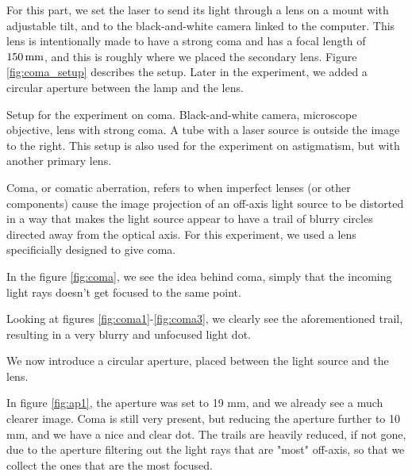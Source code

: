 
For this part, we set the laser to send its light through
a lens on a mount with adjustable tilt, and to the black-and-white camera
linked to the computer. This lens is intentionally made to have a strong coma
and has a focal length of $150 \, \textrm{mm}$, and this is roughly where we placed the
secondary lens. Figure \vref{fig:coma_setup} describes the setup. Later in the
experiment, we added a circular aperture between the lamp and the lens.

    {Setup for the experiment on coma. Black-and-white camera, microscope
    objective, lens with strong coma. A tube with a laser source is outside the
    image to the right. This setup is also used for the experiment on
    astigmatism, but with another primary lens.}

Coma, or comatic aberration, refers to when imperfect lenses 
(or other components) cause the image projection of an off-axis 
light source to be distorted in a way that makes the light source
appear to have a trail of blurry circles directed away from the 
optical axis. For this experiment, we used a lens specificially 
designed to give coma. 

In the figure \vref{fig:coma}, we see the idea behind coma, 
simply that the incoming light rays doesn't get focused to the same point.



Looking at figures \vref{fig:coma1}-\vref{fig:coma3}, we clearly see
the aforementioned trail, resulting in a very blurry and unfocused light dot.

We now introduce a circular aperture, placed between the light source and the
lens.

In figure \vref{fig:ap1}, the aperture was set to 19 mm, and we already see
a much clearer image. Coma is still very present, but reducing the aperture
further to 10 mm, and we have a nice and clear dot. The trails are heavily 
reduced, if not gone, due to the aperture filtering out the light rays that 
are "most" off-axis, so that we collect the ones that are the most focused.

